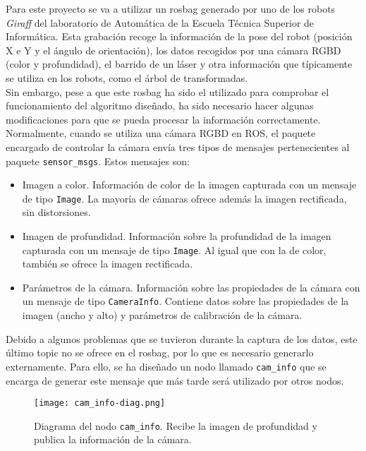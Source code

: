 Para este proyecto se va a utilizar un rosbag generado por uno de los robots \textit{Giraff} del laboratorio de Automática de la Escuela Técnica Superior de Informática. Esta grabación recoge la información de la pose del robot (posición X e Y y el ángulo de orientación), los datos recogidos por una cámara RGBD (color y profundidad), el barrido de un láser y otra información que típicamente se utiliza en los robots, como el árbol de transformadas.\\

Sin embargo, pese a que este rosbag ha sido el utilizado para comprobar el funcionamiento del algoritmo diseñado, ha sido necesario hacer algunas modificaciones para que se pueda procesar la información correctamente.\\

Normalmente, cuando se utiliza una cámara RGBD en ROS, el paquete encargado de controlar la cámara envía tres tipos de mensajes pertenecientes al paquete \texttt{sensor\_msgs}. Estos mensajes son:

\begin{itemize}

	\item Imagen a color. Información de color de la imagen capturada con un mensaje de tipo \texttt{Image}. La mayoría de cámaras ofrece además la imagen rectificada, sin distorsiones.
	\item Imagen de profundidad. Información sobre la profundidad de la imagen capturada con un mensaje de tipo \texttt{Image}. Al igual que con la de color, también se ofrece la imagen rectificada.
	\item Parámetros de la cámara. Información sobre las propiedades de la cámara con un mensaje de tipo \texttt{CameraInfo}. Contiene datos sobre las propiedades de la imagen (ancho y alto) y parámetros de calibración de la cámara.

\end{itemize}

Debido a algunos problemas que se tuvieron durante la captura de los datos, este último topic no se ofrece en el rosbag, por lo que es necesario generarlo externamente. Para ello, se ha diseñado un nodo llamado \texttt{cam\_info} que se encarga de generar este mensaje que más tarde será utilizado por otros nodos.\\

\begin{figure}[h]
	\begin{center} 
		\texttt{[image: cam\_info-diag.png]}
	\end{center}
	\caption{Diagrama del nodo \texttt{cam\_info}. Recibe la imagen de profundidad y publica la información de la cámara.}
	\label{fig:cam_info}
\end{figure}

